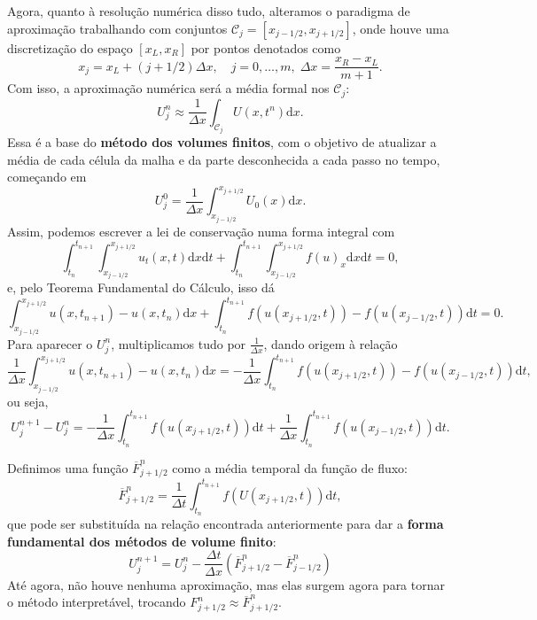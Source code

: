 \documentclass[../differential_methods.tex]{subfiles}
\begin{document}
Agora, quanto à resolução numérica disso tudo, alteramos o paradigma de aproximação trabalhando com conjuntos \(\mathcal{C}_{j}=[x_{j-1/2}, x_{j+1/2}]\), onde houve uma discretização do espaço \([x_{L}, x_{R}]\) por pontos denotados como
\[
	x_{j} = x_{L}+(j+1/2)\Delta x, \quad j=0, \dotsc , m, \; \Delta x = \frac{x_R - x_L}{m+1}.
\]
Com isso, a aproximação numérica será a média formal nos \(\mathcal{C}_{j}\):
\[
	U_{j}^{n}\approx \frac{1}{\Delta x}\int_{\mathcal{C}_{j}}^{} U(x, t^{n})\mathrm{d}x.
\]
Essa é a base do \textbf{método dos volumes finitos}, com o objetivo de atualizar a média de cada célula da malha e da parte desconhecida a cada passo no tempo, começando em
\[
	U_{j}^{0} = \frac{1}{\Delta x} \int_{x_{j-1/2}}^{x_{j+1/2}}U_{0}(x) \mathrm{d}x.
\]
Assim, podemos escrever a lei de conservação numa forma integral com
\[
	\int_{t_{n}}^{t_{n+1}}\int_{x_{j-1/2}}^{x_{j+1/2}}u_{t}(x, t) \mathrm{d}x \mathrm{d}t + \int_{t_{n}}^{t_{n+1}}\int_{x_{j-1/2}}^{x_{j+1/2}}f(u)_x \mathrm{d}x \mathrm{d}t=0,
\]
e, pelo Teorema Fundamental do Cálculo, isso dá
\[
	\int_{x_{j-1/2}}^{x_{j+1/2}}u(x, t_{n+1}) - u(x, t_{n}) \mathrm{d}x + \int_{t_{n}}^{t_{n+1}}f(u(x_{j+1/2}, t))-f(u(x_{j-1/2}, t)) \mathrm{d}t = 0.
\]
Para aparecer o \(U_{j}^{n}\), multiplicamos tudo por \(\frac{1}{\Delta x}\), dando origem à relação
\[
	\frac{1}{\Delta x}\int_{x_{j-1/2}}^{x_{j+1/2}}u(x, t_{n+1}) - u(x, t_{n}) \mathrm{d}x =-\frac{1}{\Delta x} \int_{t_{n}}^{t_{n+1}}f(u(x_{j+1/2}, t))-f(u(x_{j-1/2}, t)) \mathrm{d}t,
\]
ou seja,
\[
	U_{j}^{n+1}-U_{j}^{n}=- \frac{1}{\Delta x}\int_{t_{n}}^{t_{n+1}}f(u(x_{j+1/2}, t)) \mathrm{d}t + \frac{1}{\Delta x}\int_{t_{n}}^{t_{n+1}}f(u(x_{j-1/2}, t)) \mathrm{d}t.
\]

Definimos uma função \(\overline{F}_{j+1/2}^{n}\) como a média temporal da função de fluxo:
\[
	\overline{F}_{j+1/2}^{n}=\frac{1}{\Delta t} \int_{t_{n}}^{t_{n+1}}f(U(x_{j+1/2}, t)) \mathrm{d}t,
\]
que pode ser substituída na relação encontrada anteriormente para dar a \textbf{forma fundamental dos métodos de volume finito}:
\[
	\boxed{U_{j}^{n+1} = U_{j}^{n}-\frac{\Delta t}{\Delta x} (\overline{F}_{j+1/2}^{n}-\overline{F}_{j-1/2}^{n})}
\]
Até agora, não houve nenhuma aproximação, mas elas surgem agora para tornar o método interpretável, trocando \(F_{j+1/2}^{n}\approx \overline{F}_{j+1/2}^{n}\).
\end{document}
